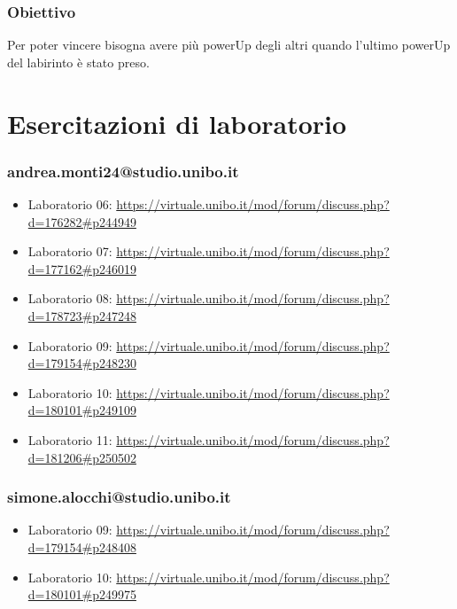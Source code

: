 \documentclass[a4paper,12pt]{report}
\begin{document}
\subsection*{Obiettivo}

Per poter vincere bisogna avere più powerUp degli altri quando l'ultimo powerUp del labirinto è stato preso.

\chapter{Esercitazioni di laboratorio}

\subsection{andrea.monti24@studio.unibo.it}

\begin{itemize}
 \item Laboratorio 06: \url{https://virtuale.unibo.it/mod/forum/discuss.php?d=176282#p244949}
 \item Laboratorio 07: \url{https://virtuale.unibo.it/mod/forum/discuss.php?d=177162#p246019}
 \item Laboratorio 08: \url{https://virtuale.unibo.it/mod/forum/discuss.php?d=178723#p247248}
 \item Laboratorio 09: \url{https://virtuale.unibo.it/mod/forum/discuss.php?d=179154#p248230}
 \item Laboratorio 10: \url{https://virtuale.unibo.it/mod/forum/discuss.php?d=180101#p249109}
 \item Laboratorio 11: \url{https://virtuale.unibo.it/mod/forum/discuss.php?d=181206#p250502}
\end{itemize}

\subsection{simone.alocchi@studio.unibo.it}

\begin{itemize}
 \item Laboratorio 09: \url{https://virtuale.unibo.it/mod/forum/discuss.php?d=179154#p248408}
 \item Laboratorio 10: \url{https://virtuale.unibo.it/mod/forum/discuss.php?d=180101#p249975}
\end{itemize}
\end{document}
